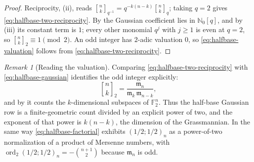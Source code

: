 \documentclass[11pt,oneside,openany]{book}
\theoremstyle{definition}
\theoremstyle{remark}
\newtheorem{remark}[remark]{Remark}
\newcommand{\qbinom}[2]{\genfrac{[}{]}{0pt}{}{#1}{#2}_{q}}
\newcommand{\Qbinom}[3]{\genfrac{[}{]}{0pt}{}{#1}{#2}_{#3}}
\newcommand{\N}{\mathbb N}
\newcommand{\F}{\mathbb F}
\newcommand{\ord}{\operatorname{ord}}
\begin{document}
\begin{proof}
Reciprocity, (ii), reads $\Qbinom nk{q^{-1}}=q^{-k(n-k)}\qbinom nk$; taking $q=2$ gives \eqref{eq:halfbase-two-reciprocity}.  By  the Gaussian coefficient lies in $\N_0[q]$, and by (iii) its constant term is $1$; every other monomial $q^j$ with $j\ge1$ is even at $q=2$, so $\Qbinom nk2\equiv1\pmod2$.  An odd integer has $2$-adic valuation $0$, so \eqref{eq:halfbase-valuation} follows from \eqref{eq:halfbase-two-reciprocity}.
\end{proof}

\begin{remark}[Reading the valuation]\label{rem:halfbase-valuation-reading}
Comparing \eqref{eq:halfbase-two-reciprocity} with \eqref{eq:halfbase-gaussian} identifies the odd integer explicitly:
\[
 \Qbinom nk2=\frac{\mathfrak m_n}{\mathfrak m_k\,\mathfrak m_{n-k}},
\]
and by  it counts the $k$-dimensional subspaces of $\F_2^n$.  Thus the half-base Gaussian row is a finite-geometric count divided by an explicit power of two, and the exponent of that power is $k(n-k)$, the dimension of the Grassmannian.  In the same way \eqref{eq:halfbase-factorial} exhibits $(1/2;1/2)_n$ as a power-of-two normalization of a product of Mersenne numbers, with $\ord_2(1/2;1/2)_n=-\binom{n+1}{2}$ because $\mathfrak m_n$ is odd.
\end{remark}
\end{document}
